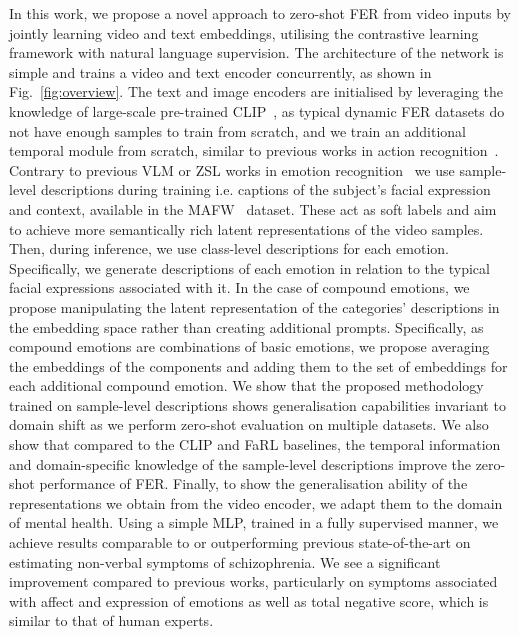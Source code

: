 \documentclass[10pt,twocolumn,letterpaper]{article}
\begin{document}
In this work, we propose a novel approach to zero-shot FER from video inputs by jointly learning video and text embeddings, utilising the contrastive learning framework with natural language supervision. The architecture of the network is simple and trains a video and text encoder concurrently, as shown in Fig.~\ref{fig:overview}.  The text and image encoders are initialised by leveraging the knowledge of large-scale pre-trained CLIP~\cite{radford_CLIP_2021}, as typical dynamic FER datasets do not have enough samples to train from scratch, and we train an additional temporal module from scratch, similar to previous works in action recognition~\cite{lin_frozen_2022, wang_actionclip_2021}.
Contrary to previous VLM or ZSL works in emotion recognition~\cite{banerjee_learning_2022, zhan_zero-shot_2019, li_cliper_2023, li_fer-former_2023} we use sample-level descriptions during training i.e. captions of the subject's facial expression and context, available in the MAFW~\cite{liu_mafw_2022} dataset. These act as soft labels and aim to achieve more semantically rich latent representations of the video samples. Then, during inference, we use class-level descriptions for each emotion. Specifically, we generate descriptions of each emotion in relation to the typical facial expressions associated with it. In the case of compound emotions, we propose manipulating the latent representation of the categories' descriptions in the embedding space rather than creating additional prompts. Specifically, as compound emotions are combinations of basic emotions, we propose averaging the embeddings of the components and adding them to the set of embeddings for each additional compound emotion.  We show that the proposed methodology trained on sample-level descriptions shows generalisation capabilities invariant to domain shift as we perform zero-shot evaluation on multiple datasets. We also show that compared to the CLIP and FaRL baselines, the temporal information and domain-specific knowledge of the sample-level descriptions improve the zero-shot performance of FER. Finally, to show the generalisation ability of the representations we obtain from the video encoder, we adapt them to the domain of mental health. Using a simple MLP, trained in a fully supervised manner, we achieve results comparable to or outperforming previous state-of-the-art on estimating non-verbal symptoms of schizophrenia. We see a significant improvement compared to previous works, particularly on symptoms associated with affect and expression of emotions as well as total negative score, which is similar to that of human experts.
\end{document}
